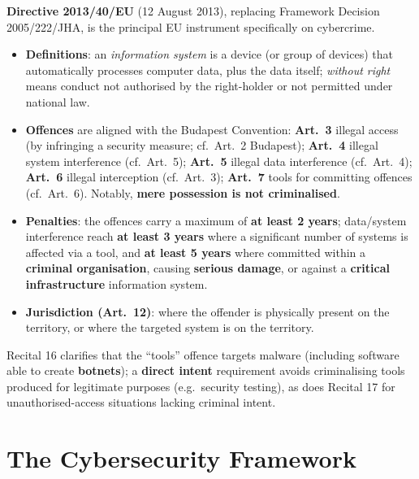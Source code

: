 \documentclass[11pt,a4paper,openany]{report}
\theoremstyle{definition}
\theoremstyle{plain}
\theoremstyle{remark}
\begin{document}
\textbf{Directive 2013/40/EU} (12 August 2013), replacing Framework Decision 2005/222/JHA, is the principal EU instrument specifically on cybercrime.
\begin{itemize}
    \item \textbf{Definitions}: an \emph{information system} is a device (or group of devices) that automatically processes computer data, plus the data itself; \emph{without right} means conduct not authorised by the right-holder or not permitted under national law.
    \item \textbf{Offences} are aligned with the Budapest Convention: \textbf{Art.\ 3} illegal access (by infringing a security measure; cf.\ Art.\ 2 Budapest); \textbf{Art.\ 4} illegal system interference (cf.\ Art.\ 5); \textbf{Art.\ 5} illegal data interference (cf.\ Art.\ 4); \textbf{Art.\ 6} illegal interception (cf.\ Art.\ 3); \textbf{Art.\ 7} tools for committing offences (cf.\ Art.\ 6). Notably, \textbf{mere possession is not criminalised}.
    \item \textbf{Penalties}: the offences carry a maximum of \textbf{at least 2 years}; data/system interference reach \textbf{at least 3 years} where a significant number of systems is affected via a tool, and \textbf{at least 5 years} where committed within a \textbf{criminal organisation}, causing \textbf{serious damage}, or against a \textbf{critical infrastructure} information system.
    \item \textbf{Jurisdiction (Art.\ 12)}: where the offender is physically present on the territory, or where the targeted system is on the territory.
\end{itemize}
Recital 16 clarifies that the ``tools'' offence targets malware (including software able to create \textbf{botnets}); a \textbf{direct intent} requirement avoids criminalising tools produced for legitimate purposes (e.g.\ security testing), as does Recital 17 for unauthorised-access situations lacking criminal intent.

\section{The Cybersecurity Framework}
\end{document}
